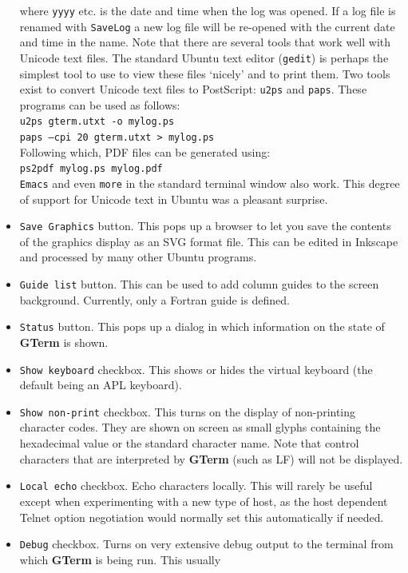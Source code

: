 \documentclass[a4paper,twoside,11pt]{article}
\begin{document}
\begin{itemize}
      where \texttt{yyyy} etc. is the date and time when the log was opened. If a log file is renamed with \texttt{SaveLog}
      a new log file will be re-opened with the current date and time in the name. Note that there are several tools
      that work well with Unicode text files. The standard Ubuntu text editor (\texttt{gedit}) is perhaps the simplest tool to use
      to view these files `nicely' and to print them. Two tools exist to convert Unicode text files to PostScript:
      \texttt{u2ps} and \texttt{paps}. These programs can be used as follows:\\
      \texttt{u2ps gterm.utxt -o mylog.ps}\\
      \texttt{paps --cpi 20 gterm.utxt > mylog.ps}\\
      Following which, PDF files can be generated using:\\
      \texttt{ps2pdf mylog.ps mylog.pdf}\\
      \texttt{Emacs} and even \texttt{more} in the standard terminal window also work. This degree of support for Unicode
      text in Ubuntu was a pleasant surprise.
\item \texttt{Save Graphics} button. This pops up a browser to let you save the contents of the graphics display as an SVG
      format file. This can be edited in Inkscape and processed by many other Ubuntu programs.
\item \texttt{Guide list} button. This can be used to add column guides to the screen background. Currently,
	only a Fortran guide is defined.
\item \texttt{Status} button. This pops up a dialog in which information on the state of \textbf{GTerm} is shown.
\item \texttt{Show keyboard} checkbox. This shows or hides the virtual keyboard (the default being an APL keyboard).
\item \texttt{Show non-print} checkbox. This turns on the display of non-printing character codes. They are shown on screen
      as small glyphs containing the hexadecimal value or the standard character name. Note that control characters that
      are interpreted by \textbf{GTerm} (such as LF) will not be displayed.
\item \texttt{Local echo} checkbox. Echo characters locally. This will rarely be useful except when experimenting with a new
      type of host, as the host dependent Telnet option negotiation would normally set this automatically if needed.
\item \texttt{Debug} checkbox. Turns on very extensive debug output to the terminal from which \textbf{GTerm} is being run. This usually

\end{itemize}
\end{document}
